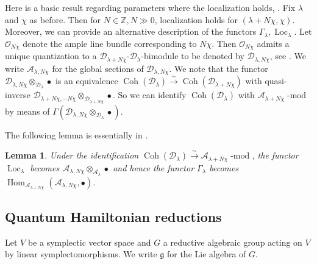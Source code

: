 \documentclass[12pt]{amsart}
\newcommand{\A}{\mathcal{A}}
\newcommand{\Z}{\mathbb{Z}}
\newcommand{\g}{\mathfrak{g}}
\newcommand{\Loc}{\operatorname{Loc}}
\newtheorem{Lem}[Thm]{Lemma}
\theoremstyle{definition}
\begin{document}
Here is a basic result regarding parameters where the localization holds, \cite[Section 5]{BPW}. Fix $\lambda$ and $\chi$
as before. Then for $N\in \Z, N\gg 0$, localization holds for $(\lambda+N\chi,\chi)$. Moreover, we can provide an alternative description of the functors $\Gamma_\lambda, \Loc_\lambda$. Let $\mathcal{O}_{N\chi}$ denote the ample
line bundle corresponding to $N\chi$. Then $\mathcal{O}_{N\chi}$ admits a unique quantization to a
$\mathcal{D}_{\lambda+N\chi}$-$\mathcal{D}_\lambda$-bimodule to be denoted by $\mathcal{D}_{\lambda, N\chi}$,
see \cite[Section 5.1]{BPW}.
We write $\A_{\lambda,N\chi}$ for the global sections of $\mathcal{D}_{\lambda,N\chi}$. We note that
the functor $\mathcal{D}_{\lambda,N\chi}\otimes_{\mathcal{D}_\lambda}\bullet$ is an equivalence
$\operatorname{Coh}(\mathcal{D}_\lambda)\xrightarrow{\sim} \operatorname{Coh}(\mathcal{D}_{\lambda+N\chi})$
with quasi-inverse $\mathcal{D}_{\lambda+N\chi,-N\chi}\otimes_{\mathcal{D}_{\lambda+N\chi}}\bullet$.
So we can identify $\operatorname{Coh}(\mathcal{D}_\lambda)$ with $\A_{\lambda+N\chi}\operatorname{-mod}$
by means of $\Gamma(\mathcal{D}_{\lambda,N\chi}\otimes_{\mathcal{D}_\lambda}\bullet)$.

The following lemma is essentially in \cite[Section 5.3]{BPW}.

\begin{Lem}\label{Lem:loc_fun}
Under the identification $\operatorname{Coh}(\mathcal{D}_\lambda)\xrightarrow{\sim}
\A_{\lambda+N\chi}\operatorname{-mod}$, the functor $\Loc_\lambda$ becomes
$\A_{\lambda,N\chi}\otimes_{\A_\lambda}\bullet$ and hence the functor $\Gamma_\lambda$
becomes  $\operatorname{Hom}_{\A_{\lambda+N\chi}}(\A_{\lambda,N\chi},\bullet)$.
\end{Lem}

\subsection{Quantum Hamiltonian reductions}\label{SS_quant_red}
Let $V$ be a symplectic vector space and $G$ a reductive algebraic group acting on $V$
by linear symplectomorphisms. We write $\g$ for the Lie algebra of $G$.
\end{document}
